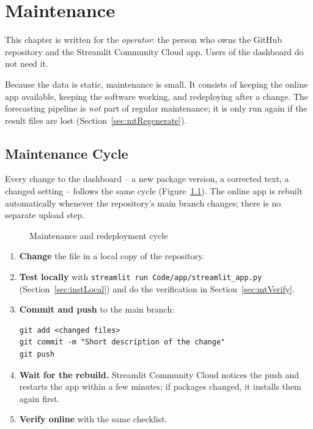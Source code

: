 %
%
%


\chapter{Maintenance}
\label{chap:maintenance}

This chapter is written for the \emph{operator}: the person who owns the GitHub repository and the Streamlit Community Cloud app. Users of the dashboard do not need it.

Because the data is static, maintenance is small. It consists of keeping the online app available, keeping the software working, and redeploying after a change. The forecasting pipeline is \emph{not} part of regular maintenance; it is only run again if the result files are lost (Section~\ref{sec:mtRegenerate}).

\section{Maintenance Cycle}
\label{sec:mtCycle}

Every change to the dashboard -- a new package version, a corrected text, a changed setting -- follows the same cycle (Figure~\ref{fig:redeployCycle}). The online app is rebuilt automatically whenever the repository's main branch changes; there is no separate upload step.

\begin{figure}[H]
  \centering
  \resizebox{0.95\linewidth}{!}{}
  \caption{Maintenance and redeployment cycle}
  \label{fig:redeployCycle}
\end{figure}

\begin{enumerate}
  \item \textbf{Change} the file in a local copy of the repository.
  \item \textbf{Test locally} with \texttt{streamlit run Code/app/streamlit\_app.py} (Section~\ref{sec:instLocal}) and do the verification in Section~\ref{sec:mtVerify}.
  \item \textbf{Commit and push} to the main branch:
\begin{lstlisting}[style=shell]
git add <changed files>
git commit -m "Short description of the change"
git push
\end{lstlisting}
  \item \textbf{Wait for the rebuild.} Streamlit Community Cloud notices the push and restarts the app within a few minutes; if packages changed, it installs them again first.
  \item \textbf{Verify online} with the same checklist.
\end{enumerate}

